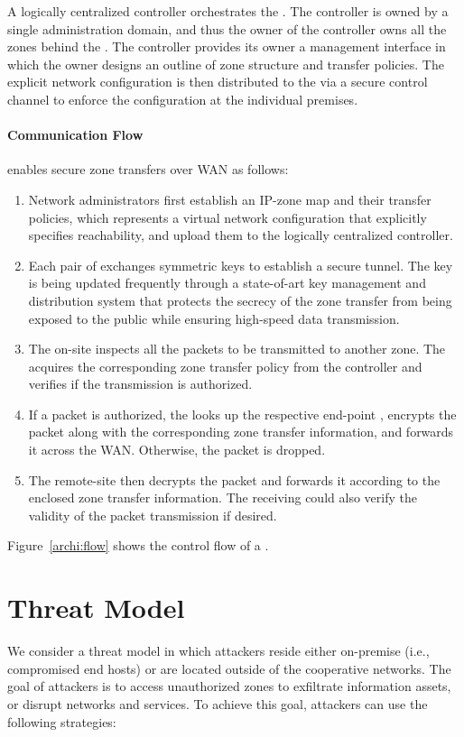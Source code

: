 A logically centralized controller orchestrates the \tps. The controller is owned
by a single administration domain, and thus the owner of the controller owns all
the zones behind the \tps. The controller provides its owner a management interface
in which the owner designs an outline of zone structure and transfer policies. The
explicit network configuration is then distributed to the \tps via a secure control
channel to enforce the configuration at the individual premises.

\paragraph{Communication Flow}

\name enables secure zone transfers over WAN as follows:

\begin{enumerate}
	\item Network administrators first establish an IP-zone map and their transfer
	      policies, which represents a virtual network configuration that explicitly
	      specifies reachability, and upload them to the logically centralized
	      controller.
	\item Each pair of \tps exchanges symmetric keys to establish a secure tunnel.
	      The key is being updated frequently through a state-of-art key management and
	      distribution system that protects the secrecy of the zone transfer from
	      being exposed to the public while ensuring high-speed data transmission.
	\item The on-site \tp inspects all the packets to be transmitted to another zone.
	      The \tp acquires the corresponding zone transfer policy from the controller
	      and verifies if the transmission is authorized.
	\item If a packet is authorized, the \tp looks up the respective end-point \tp,
	      encrypts the packet along with the corresponding zone transfer information,
	      and forwards it across the WAN. Otherwise, the packet is dropped.
	\item The remote-site \tp then decrypts the packet and forwards it according to
	      the enclosed zone transfer information. The receiving \tp could also verify
	      the validity of the packet transmission if desired.
\end{enumerate}

Figure~\ref{archi:flow} shows the control flow of a \tp.

\section{Threat Model}
\label{sec:threatmodel}
We consider a threat model in which attackers reside either on-premise (i.e., compromised
end hosts) or are located
outside of the cooperative networks. The goal of attackers is to access unauthorized zones
to exfiltrate information assets, or disrupt networks and services. To achieve this goal,
attackers can use the following strategies:

